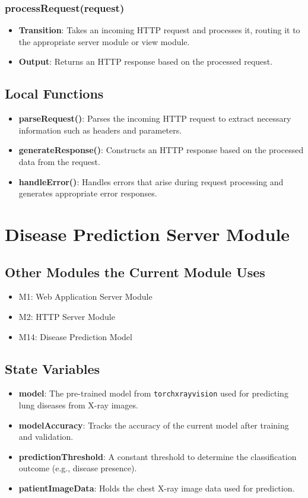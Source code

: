 \documentclass[12pt, titlepage]{article}
\begin{document}
\subsubsection{processRequest(request)}
\begin{itemize}
    \item \textbf{Transition}: Takes an incoming HTTP request and processes it, routing it to the appropriate server module or view module.
    \item \textbf{Output}: Returns an HTTP response based on the processed request.
\end{itemize}

\subsection{Local Functions}
\begin{itemize}
    \item \textbf{parseRequest()}: Parses the incoming HTTP request to extract necessary information such as headers and parameters.
    \item \textbf{generateResponse()}: Constructs an HTTP response based on the processed data from the request.
    \item \textbf{handleError()}: Handles errors that arise during request processing and generates appropriate error responses.
\end{itemize}

\section{Disease Prediction Server Module}

\subsection{Other Modules the Current Module Uses}
\begin{itemize}
    \item M1: Web Application Server Module
    \item M2: HTTP Server Module
    \item M14: Disease Prediction Model
\end{itemize}

\subsection{State Variables}
\begin{itemize}
    \item \textbf{model}: The pre-trained model from \texttt{torchxrayvision} used for predicting lung diseases from X-ray images.
    \item \textbf{modelAccuracy}: Tracks the accuracy of the current model after training and validation.
    \item \textbf{predictionThreshold}: A constant threshold to determine the classification outcome (e.g., disease presence).
    \item \textbf{patientImageData}: Holds the chest X-ray image data used for prediction.
\end{itemize}
\end{document}
